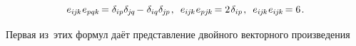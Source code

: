 \begin{otherlanguage}{russian}
\nopagebreak\vspace{-0.3em}\begin{equation}\label{veblencontraction}
e_{i\hspace{-0.1ex}j\hspace{-0.1ex}k} \hspace{.1ex} e_{pqk} \hspace{-0.25ex} = \delta_{ip} \delta_{\hspace{-0.1ex}j\hspace{-0.1ex}q} \hspace{-0.25ex} - \hspace{.1ex} \delta_{iq} \delta_{\hspace{-0.1ex}j\hspace{-0.1ex}p}
\hspace{.2ex} ,
\hspace{.5em}
%
e_{i\hspace{-0.1ex}j\hspace{-0.1ex}k} \hspace{.1ex} e_{pj\hspace{-0.1ex}k} \hspace{-0.25ex} = 2 \hspace{.2ex} \delta_{ip}
\hspace{.2ex} ,
\hspace{.5em}
%
e_{i\hspace{-0.1ex}j\hspace{-0.1ex}k} \hspace{.1ex} e_{i\hspace{-0.1ex}j\hspace{-0.1ex}k} \hspace{-0.25ex} = 6
\hspace{.2ex} .
\end{equation}

Первая из~этих формул даёт представление двойного векторного произведения


\end{otherlanguage}
